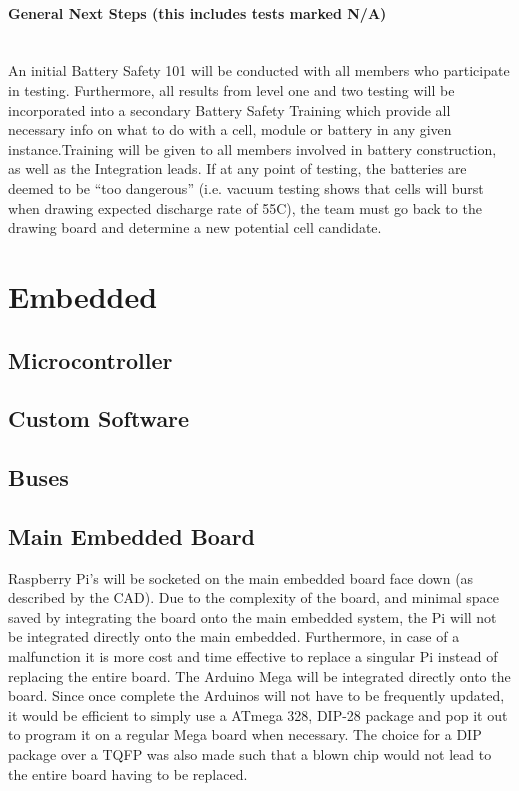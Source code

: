\documentclass{report}
\let\oldparagraph\paragraph
\renewcommand{\paragraph}[1]{\oldparagraph{#1}\mbox{}\\}
\begin{document}
    \paragraph{General Next Steps (this includes tests marked N/A)}
    An initial Battery Safety 101 will be conducted with all members who participate in testing. Furthermore, all results from level one and two testing will be incorporated into a secondary Battery Safety Training which provide all necessary info on what to do with a cell, module or battery in any given instance.Training will be given to all members involved in battery construction, as well as the Integration leads. If at any point of testing, the batteries are deemed to be “too dangerous” (i.e. vacuum testing shows that cells will burst when drawing expected discharge rate of 55C), the team must go back to the drawing board and determine a new potential cell candidate.
    \section{Embedded}
    \subsection{Microcontroller}
    \subsection{Custom Software}
    \subsection{Buses}
    \subsection{Main Embedded Board}
    Raspberry Pi’s will be socketed on the main embedded board face down (as described by the CAD). Due to the complexity of the board, and minimal space saved by integrating the board onto the main embedded system, the Pi will not be integrated directly onto the main embedded. Furthermore, in case of a malfunction it is more cost and time effective to replace a singular Pi instead of replacing the entire board. The Arduino Mega will be integrated directly onto the board. Since once complete the Arduinos will not have to be frequently updated, it would be efficient to simply use a ATmega 328, DIP-28 package and pop it out to program it on a regular Mega board when necessary. The choice for a DIP package over a TQFP was also made such that a blown chip would not lead to the entire board having to be replaced.
    
\end{document}
